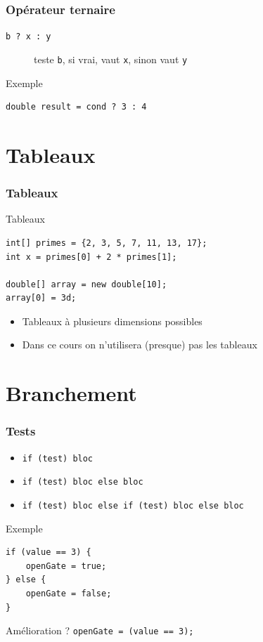 \documentclass[english, french]{beamer}
\begin{document}
\begin{frame}[fragile]
	\frametitle{Opérateur ternaire}
	\begin{description}
		\item[\texttt{b ? x : y}] teste \texttt{b}, si vrai, vaut \texttt{x}, sinon vaut \texttt{y}
	\end{description}
	\begin{block}{Exemple}
		\begin{lstlisting}
double result = cond ? 3 : 4
		\end{lstlisting}
	\end{block}
\end{frame}

\section{Tableaux}
\begin{frame}[fragile]
	\frametitle{Tableaux}
	\begin{block}{Tableaux}
		\begin{lstlisting}
int[] primes = {2, 3, 5, 7, 11, 13, 17};
int x = primes[0] + 2 * primes[1];

double[] array = new double[10];
array[0] = 3d;
		\end{lstlisting}	
	\end{block}
	\begin{itemize}
		\item Tableaux à plusieurs dimensions possibles
		\item Dans ce cours on n’utilisera (presque) pas les tableaux
	\end{itemize}
\end{frame}

\section{Branchement}
\begin{frame}[fragile]
	\frametitle{Tests}
	\begin{itemize}
		\item \texttt{if (test) bloc}
		\item \texttt{if (test) bloc else bloc}
		\item \texttt{if (test) bloc else if (test) bloc else bloc}
	\end{itemize}
	\begin{block}{Exemple}
		\begin{lstlisting}
if (value == 3) {
	openGate = true;
} else {
	openGate = false;
}
		\end{lstlisting}	
	\end{block}
	Amélioration ? \pause \texttt{openGate = (value == 3);}
\end{frame}
\end{document}
